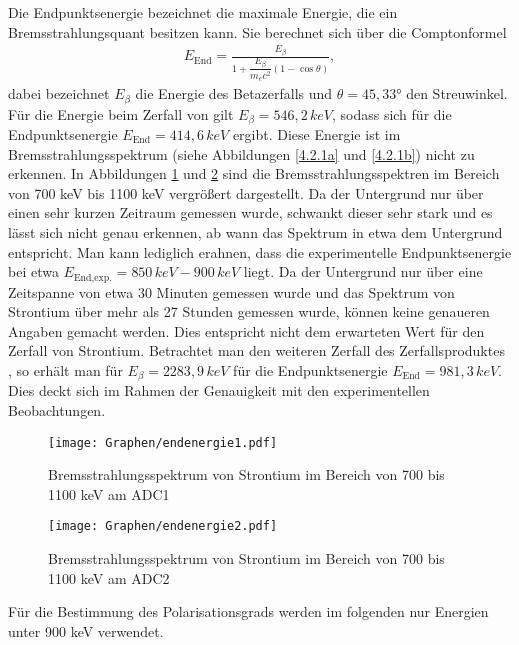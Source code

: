 \documentclass[twoside,colorback,accentcolor=tud4c,11pt]{tudreport}
\begin{document}
Die Endpunktsenergie bezeichnet die maximale Energie, die ein Bremsstrahlungsquant besitzen kann. Sie berechnet sich über die Comptonformel
\begin{align*}
E_{\text{End}}=\frac{E_{\beta}}{1+\dfrac{E_{\beta}}{m_ec^2}\left(1-\cos{\theta}\right)},
\end{align*}
dabei bezeichnet $E_{\beta}$ die Energie des Betazerfalls und $\theta=45,33$° den Streuwinkel. Für die Energie beim Zerfall von  gilt $E_{\beta}=546,2\,\si{keV}$, sodass sich für die Endpunktsenergie $E_{\text{End}}=414,6\,\si{keV}$ ergibt. Diese Energie ist im Bremsstrahlungsspektrum (siehe Abbildungen \ref{4.2.1a} und \ref{4.2.1b}) nicht zu erkennen. In Abbildungen \ref{4.2.1c} und \ref{4.2.1d} sind die Bremsstrahlungsspektren im Bereich von 700 keV bis 1100 keV vergrößert dargestellt. Da der Untergrund nur über einen sehr kurzen Zeitraum gemessen wurde, schwankt dieser sehr stark und es lässt sich nicht genau erkennen, ab wann das Spektrum in etwa dem Untergrund entspricht. Man kann lediglich erahnen, dass die experimentelle Endpunktsenergie bei etwa $E_{\text{End,exp.}}=850\,\si{keV} - 900\,\si{keV}$ liegt. Da der Untergrund nur über eine Zeitspanne von etwa 30 Minuten gemessen wurde und das Spektrum von Strontium über mehr als 27 Stunden gemessen wurde, können keine genaueren Angaben gemacht werden. Dies entspricht nicht dem erwarteten Wert für den Zerfall von Strontium. Betrachtet man den weiteren Zerfall des Zerfallsproduktes , so erhält man für $E_{\beta}=2283,9\,\si{keV}$ für die Endpunktsenergie  $E_{\text{End}}=981,3\,\si{keV}$. Dies deckt sich im Rahmen der Genauigkeit mit den experimentellen Beobachtungen. 
\begin{figure}[H]
\centering
   	\begin{minipage}[b]{1\textwidth}
   	\texttt{[image: Graphen/endenergie1.pdf]}
   	\caption{Bremsstrahlungsspektrum von Strontium im Bereich von 700 bis 1100 keV am ADC1}
  	\label{4.2.1c}
   	\end{minipage}
\end{figure}  
\begin{figure}[H]
\centering
   	\begin{minipage}[b]{1\textwidth}
   	\texttt{[image: Graphen/endenergie2.pdf]}
   	\caption{Bremsstrahlungsspektrum von Strontium im Bereich von 700 bis 1100 keV am ADC2}
  	\label{4.2.1d}
   	\end{minipage}
\end{figure}
Für die Bestimmung des Polarisationsgrads werden im folgenden nur Energien unter 900 keV verwendet.
\end{document}

